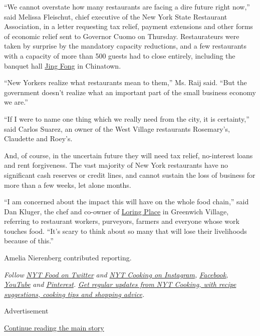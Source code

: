 ``We cannot overstate how many restaurants are facing a dire future
right now,'' said Melissa Fleischut, chief executive of the New York
State Restaurant Association, in a letter requesting tax relief, payment
extensions and other forms of economic relief sent to Governor Cuomo on
Thursday. Restaurateurs were taken by surprise by the mandatory capacity
reductions, and a few restaurants with a capacity of more than 500
guests had to close entirely, including the banquet hall
\href{https://twitter.com/JingFongNY/status/1238490120795414528}{Jing
Fong} in Chinatown.

``New Yorkers realize what restaurants mean to them,'' Ms. Raij said.
``But the government doesn't realize what an important part of the small
business economy we are.''

``If I were to name one thing which we really need from the city, it is
certainty,'' said Carlos Suarez, an owner of the West Village
restaurants Rosemary's, Claudette and Roey's.

And, of course, in the uncertain future they will need tax relief,
no-interest loans and rent forgiveness. The vast majority of New York
restaurants have no significant cash reserves or credit lines, and
cannot sustain the loss of business for more than a few weeks, let alone
months.

``I am concerned about the impact this will have on the whole food
chain,'' said Dan Kluger, the chef and co-owner of
\href{https://www.nytimes3xbfgragh.onion/2017/05/02/dining/loring-place-review-greenwich-village.html}{Loring
Place} in Greenwich Village, referring to restaurant workers, purveyors,
farmers and everyone whose work touches food. ``It's scary to think
about so many that will lose their livelihoods because of this.''

Amelia Nierenberg contributed reporting.

\emph{Follow} \href{https://twitter.com/nytfood}{\emph{NYT Food on
Twitter}} \emph{and}
\href{https://www.instagram.com/nytcooking/}{\emph{NYT Cooking on
Instagram}}\emph{,}
\href{https://www.facebookcorewwwi.onion/nytcooking/}{\emph{Facebook}}\emph{,}
\href{https://www.youtube.com/nytcooking}{\emph{YouTube}} \emph{and}
\href{https://www.pinterest.com/nytcooking/}{\emph{Pinterest}}\emph{.}
\href{https://www.nytimes3xbfgragh.onion/newsletters/cooking}{\emph{Get
regular updates from NYT Cooking, with recipe suggestions, cooking tips
and shopping advice}}\emph{.}

Advertisement

\protect\hyperlink{after-bottom}{Continue reading the main story}

